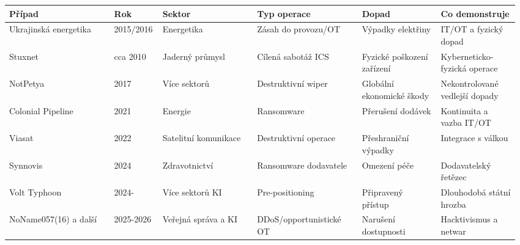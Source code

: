 \begin{longtable}{p{0.20\linewidth}p{0.09\linewidth}p{0.18\linewidth}p{0.20\linewidth}p{0.15\linewidth}p{0.15\linewidth}}
\toprule
\textbf{Případ} & \textbf{Rok} & \textbf{Sektor} & \textbf{Typ operace} & \textbf{Dopad} & \textbf{Co demonstruje}\\
\midrule
Ukrajinská energetika & 2015/2016 & Energetika & Zásah do provozu/OT & Výpadky elektřiny & IT/OT a fyzický dopad\\
Stuxnet & cca 2010 & Jaderný průmysl & Cílená sabotáž ICS & Fyzické poškození zařízení & Kyberneticko-fyzická operace\\
NotPetya & 2017 & Více sektorů & Destruktivní wiper & Globální ekonomické škody & Nekontrolované vedlejší dopady\\
Colonial Pipeline & 2021 & Energie & Ransomware & Přerušení dodávek & Kontinuita a vazba IT/OT\\
Viasat & 2022 & Satelitní komunikace & Destruktivní operace & Přeshraniční výpadky & Integrace s válkou\\
Synnovis & 2024 & Zdravotnictví & Ransomware dodavatele & Omezení péče & Dodavatelský řetězec\\
Volt Typhoon & 2024- & Více sektorů KI & Pre-positioning & Připravený přístup & Dlouhodobá státní hrozba\\
NoName057(16) a další & 2025-2026 & Veřejná správa a KI & DDoS/opportunistické OT & Narušení dostupnosti & Hacktivismus a netwar\\
\bottomrule
\end{longtable}


